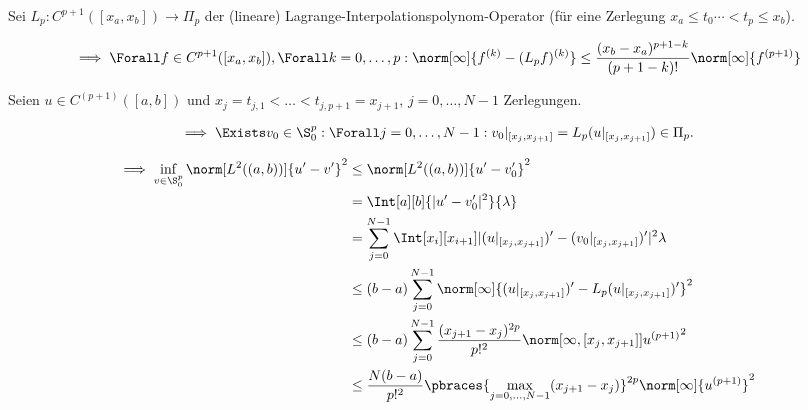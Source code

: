 \begin{solution}

Sei $L_p: C^{p+1}([x_a, x_b]) \to \Pi_p$ der (lineare) Lagrange-Interpolationspolynom-Operator (für eine Zerlegung $x_a \leq t_0 \cdots < t_p \leq x_b$).


\begin{align*}
  \implies
  \Forall f \in C^{p+1}([x_a, x_b]),
  \Forall k = 0, \dots, p:
  \norm[\infty]
  {
    f^{(k)} - (L_p f)^{(k)}
  }
  \leq
  \frac
  {
    (x_b - x_a)^{p+1-k}
  }{
    (p + 1 - k)!
  }
  \norm[\infty]
  {
    f^{(p+1)}
  }
\end{align*}

Seien $u \in C^{(p+1)}([a, b])$ und $x_j = t_{j, 1} < \dots < t_{j, p+1} = x_{j+1}$, $j = 0, \dots, N-1$ Zerlegungen.

\begin{align*}
  \implies
  \Exists v_0 \in \S_0^p:
  \Forall j = 0, \dots, N-1:
  v_0|_{[x_j , x_{j+1}]}
  =
  L_p(u|_{[x_j , x_{j+1}]})
  \in
  \Pi_p.
\end{align*}

\begin{align*}
  \implies
  \inf_{v \in \S^p_0}
  \norm[L^2((a, b))]{u^\prime - v^\prime}^2
  & \leq
  \norm[L^2((a, b))]{u^\prime - v_0^\prime}^2 \\
  & =
  \Int[a][b]
  {|u^\prime - v_0^\prime|^2}
  {\lambda} \\
  & =
  \sum_{j=0}^{N-1}
  \Int[x_i][x_{i+1}]
  {
    |
      (u|_{[x_j , x_{j+1}]})^\prime
      -
      (v_0|_{[x_j , x_{j+1}]})^\prime
    |^2
  }
  {\lambda} \\
  & \leq
  (b-a)
  \sum_{j=0}^{N-1}
  \norm[\infty]
  {
    (u|_{[x_j , x_{j+1}]})^\prime
    -
    L_p(u|_{[x_j , x_{j+1}]})^\prime
  }^2 \\
  & \leq
  (b-a)
  \sum_{j=0}^{N-1}
  \frac
  {
    ({x_{j+1} - x_j})^{2p}
  }{p!^2}
  \norm
  [{\infty, [x_j,x_{j+1}]}]
  {u^{(p+1)}}^2 \\
  & \leq
  \frac{N (b-a)}{p!^2}
  \pbraces
  {
    \max_{j=0, \dots, N-1}
    (x_{j+1} - x_j)
  }^{2p}
  \norm[\infty]{u^{(p+1)}}^2
\end{align*}

\end{solution}

